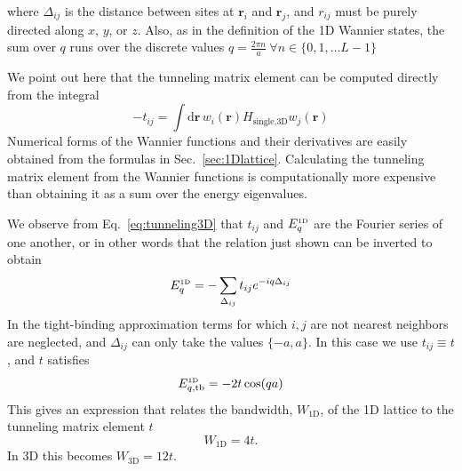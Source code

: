 \documentclass[11pt,letter]{article}
\newcommand{\bv}[1]{\ensuremath{\bm{#1}}}
\begin{document}
where $\Delta_{ij}$ is the distance between sites at $\bv{r}_{i}$ and
$\bv{r}_{j}$, and $r_{ij}$ must be purely directed along $x$, $y$, or $z$.
Also, as in the definition of the 1D Wannier states, the sum over $q$ runs over
the discrete values $q = \frac{2\pi n}{a} \  \forall n \in \lbrace
0,1,\ldots L-1\rbrace$

We point out here that the tunneling matrix element can be computed directly
from the integral \begin{equation}
  -t_{ij} = \int \mathrm{d}\bv{r} \, w_{i}(\bv{r}) H_{\text{single,3D}} w_{j}(\bv{r}) 
\end{equation}
Numerical forms of the Wannier functions and their derivatives are easily
obtained from the formulas in Sec.~\ref{sec:1Dlattice}.   Calculating the
tunneling matrix element from the Wannier functions is computationally more
expensive than obtaining it as a sum over the energy eigenvalues. 

We observe from Eq.~\ref{eq:tunneling3D} that $t_{ij}$ and $E_{q}^{\text{\tiny
1D}}$ are the Fourier series of one another, or in other words that the
relation just shown can be inverted to obtain 
\begin{equation} 
  E_{q}^{\text{\tiny 1D}} = - \sum_{\Delta_{ij}} t_{ij} e^{-iq \Delta_{ij}} 
\end{equation}
In the tight-binding approximation terms for which $i,j$ are not nearest
neighbors are neglected, and  $\Delta_{ij}$ can only take the values $\lbrace
-a, a \rbrace$.  In this case we use $t_{ij}\equiv t$, and $t$ satisfies
\begin{equation}
  E_{q,\text{tb}}^{\text{\tiny 1D}} = -2 t\cos( qa) 
\end{equation}
This gives an expression that relates the bandwidth, $W_{\text{1D}}$, of the 1D
lattice to the tunneling matrix element $t$ 
\begin{equation} W_{\text{1D}}=4t.\end{equation}  
In 3D this becomes
$W_{\text{3D}}= 12t$.
\end{document}
